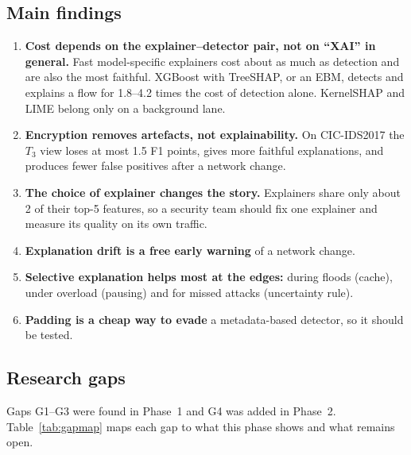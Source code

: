 \subsection{Main findings}
\begin{enumerate}[leftmargin=*, itemsep=0pt]
  \item \textbf{Cost depends on the explainer--detector pair, not on ``XAI'' in general.} Fast model-specific explainers cost about as much as detection and are also the most faithful. XGBoost with TreeSHAP, or an EBM, detects and explains a flow for 1.8--4.2 times the cost of detection alone. KernelSHAP and LIME belong only on a background lane.
  \item \textbf{Encryption removes artefacts, not explainability.} On CIC-IDS2017 the $T_3$ view loses at most 1.5 F1 points, gives more faithful explanations, and produces fewer false positives after a network change.
  \item \textbf{The choice of explainer changes the story.} Explainers share only about 2 of their top-5 features, so a security team should fix one explainer and measure its quality on its own traffic.
  \item \textbf{Explanation drift is a free early warning} of a network change.
  \item \textbf{Selective explanation helps most at the edges:} during floods (cache), under overload (pausing) and for missed attacks (uncertainty rule).
  \item \textbf{Padding is a cheap way to evade} a metadata-based detector, so it should be tested.
\end{enumerate}

\subsection{Research gaps}
Gaps G1--G3 were found in Phase~1 and G4 was added in Phase~2. Table~\ref{tab:gapmap} maps each gap to what this phase shows and what remains open.

